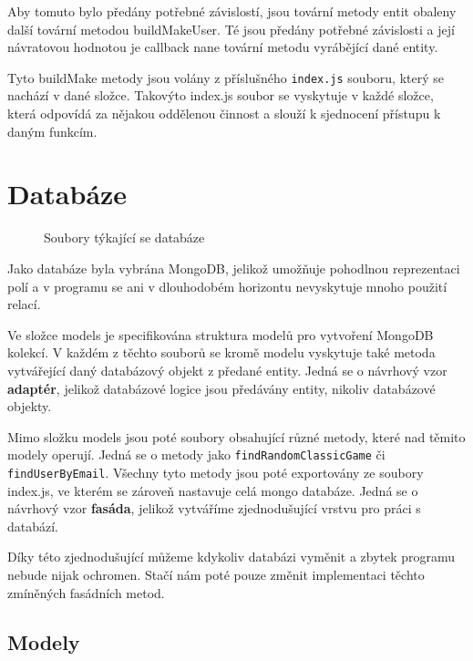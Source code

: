\documentclass[a4paper,oneside,12pt]{report}
\begin{document}
Aby tomuto bylo předány potřebné závislostí, jsou tovární metody entit obaleny další tovární metodou buildMakeUser. Té jsou předány potřebné závislosti a její návratovou hodnotou je callback nane tovární metodu vyrábějící dané entity.

Tyto buildMake metody jsou volány z příslušného \texttt{index.js} souboru, který se nachází v dané složce. Takovýto index.js soubor se vyskytuje v každé složce, která odpovídá za nějakou oddělenou činnost a slouží k sjednocení přístupu k daným funkcím.  

\section{Databáze}

\begin{figure}[H]
   \caption[Soubory týkající se databáze]{Soubory týkající se databáze}
   \label{fig:sqlClasses}
\end{figure}

Jako databáze byla vybrána MongoDB, jelikož umožňuje pohodlnou reprezentaci polí a v programu se ani v dlouhodobém horizontu nevyskytuje mnoho použití relací. 

Ve složce models je specifikována struktura modelů pro vytvoření MongoDB kolekcí. V každém z těchto souborů se kromě modelu vyskytuje také metoda vytvářející daný databázový objekt z předané entity. Jedná se o návrhový vzor \textbf{adaptér}, jelikož databázové logice jsou předávány entity, nikoliv databázové objekty.

Mimo složku models jsou poté soubory obsahující různé metody, které nad těmito modely operují. Jedná se o metody jako \texttt{findRandomClassicGame} či \texttt{findUserByEmail}. Všechny tyto metody jsou poté exportovány ze soubory index.js, ve kterém se zároveň nastavuje celá mongo databáze. Jedná se o návrhový vzor \textbf{fasáda}, jelikož vytváříme zjednodušující vrstvu pro práci s databází.

Díky této zjednodušující můžeme kdykoliv databázi vyměnit a zbytek programu nebude nijak ochromen. Stačí nám poté pouze změnit implementaci těchto zmíněných fasádních metod.

\subsection{Modely}
\end{document}
